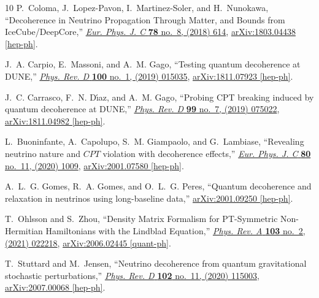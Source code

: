 \documentclass[aps, prd, onecolumn, tightenlines, notitlepage, superscriptaddress, nofootinbib, preprintnumbers, floatfix,showkeys,11pt]{revtex4-2}
\begin{document}
\begin{thebibliography}{10}
P.~Coloma, J.~Lopez-Pavon, I.~Martinez-Soler, and H.~Nunokawa, ``{Decoherence
  in Neutrino Propagation Through Matter, and Bounds from IceCube/DeepCore},''
  \href{http://dx.doi.org/10.1140/epjc/s10052-018-6092-6}{{\em Eur. Phys. J. C}
  {\bfseries 78} no.~8, (2018) 614},
  \href{http://arxiv.org/abs/1803.04438}{{\ttfamily arXiv:1803.04438
  [hep-ph]}}.

J.~A. Carpio, E.~Massoni, and A.~M. Gago, ``{Testing quantum decoherence at
  DUNE},'' \href{http://dx.doi.org/10.1103/PhysRevD.100.015035}{{\em Phys. Rev.
  D} {\bfseries 100} no.~1, (2019) 015035},
  \href{http://arxiv.org/abs/1811.07923}{{\ttfamily arXiv:1811.07923
  [hep-ph]}}.

J.~C. Carrasco, F.~N. D\'\i{}az, and A.~M. Gago, ``{Probing CPT breaking
  induced by quantum decoherence at DUNE},''
  \href{http://dx.doi.org/10.1103/PhysRevD.99.075022}{{\em Phys. Rev. D}
  {\bfseries 99} no.~7, (2019) 075022},
  \href{http://arxiv.org/abs/1811.04982}{{\ttfamily arXiv:1811.04982
  [hep-ph]}}.

L.~Buoninfante, A.~Capolupo, S.~M. Giampaolo, and G.~Lambiase, ``{Revealing
  neutrino nature and $CPT$ violation with decoherence effects},''
  \href{http://dx.doi.org/10.1140/epjc/s10052-020-08549-9}{{\em Eur. Phys. J.
  C} {\bfseries 80} no.~11, (2020) 1009},
  \href{http://arxiv.org/abs/2001.07580}{{\ttfamily arXiv:2001.07580
  [hep-ph]}}.

A.~L.~G. Gomes, R.~A. Gomes, and O.~L.~G. Peres, ``{Quantum decoherence and
  relaxation in neutrinos using long-baseline data},''
  \href{http://arxiv.org/abs/2001.09250}{{\ttfamily arXiv:2001.09250
  [hep-ph]}}.

T.~Ohlsson and S.~Zhou, ``{Density Matrix Formalism for PT-Symmetric
  Non-Hermitian Hamiltonians with the Lindblad Equation},''
  \href{http://dx.doi.org/10.1103/PhysRevA.103.022218}{{\em Phys. Rev. A}
  {\bfseries 103} no.~2, (2021) 022218},
  \href{http://arxiv.org/abs/2006.02445}{{\ttfamily arXiv:2006.02445
  [quant-ph]}}.

T.~Stuttard and M.~Jensen, ``{Neutrino decoherence from quantum gravitational
  stochastic perturbations},''
  \href{http://dx.doi.org/10.1103/PhysRevD.102.115003}{{\em Phys. Rev. D}
  {\bfseries 102} no.~11, (2020) 115003},
  \href{http://arxiv.org/abs/2007.00068}{{\ttfamily arXiv:2007.00068
  [hep-ph]}}.


\end{thebibliography}
\end{document}
